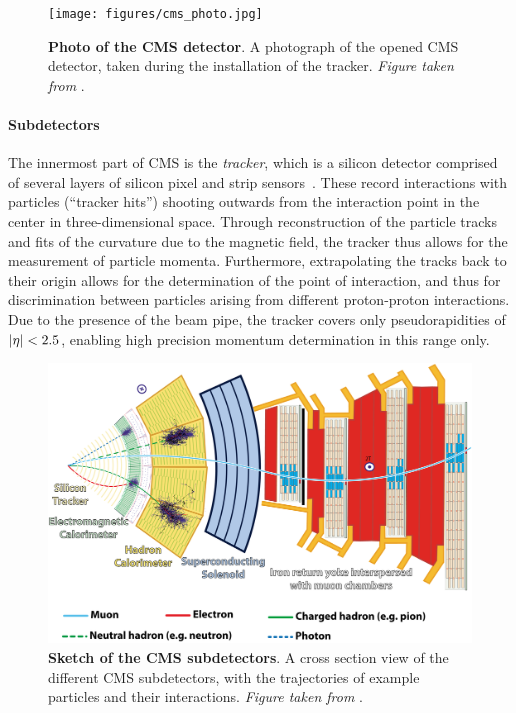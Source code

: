 \begin{figure}[!t]
    \centering
    \texttt{[image: figures/cms\_photo.jpg]}
    \caption{\textbf{Photo of the CMS detector}. A photograph of the opened CMS detector, taken during the installation of the tracker. \textit{Figure taken from }.}
\end{figure}

\paragraph{Subdetectors}
The innermost part of CMS is the \textit{tracker}, which is a silicon detector comprised of several layers of silicon pixel and strip sensors~\cite{CMS:2014pgm,CMSTrackerGroup:2020edz}. These record interactions with particles (``tracker hits'') shooting outwards from the interaction point in the center in three-dimensional space. Through reconstruction of the particle tracks and fits of the curvature due to the magnetic field, the tracker thus allows for the measurement of particle momenta. Furthermore, extrapolating the tracks back to their origin allows for the determination of the point of interaction, and thus for discrimination between particles arising from different proton-proton interactions. Due to the presence of the beam pipe, the tracker covers only pseudorapidities of $|\eta| < 2.5$, enabling high precision momentum determination in this range only.

\begin{figure}[!t]
    \centering
    \includegraphics[width=\textwidth]{figures/cms_slice.png}
    \caption{\textbf{Sketch of the CMS subdetectors}. A cross section view of the different CMS subdetectors, with the trajectories of example particles and their interactions. \textit{Figure taken from }.}
\end{figure}

